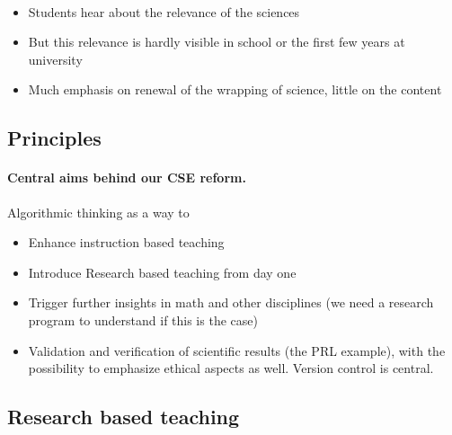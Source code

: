 \documentclass[%
twoside,                 %
final,                   %
10pt]{article}
\begin{document}
\paragraph{}

\begin{itemize}
\item Students hear about the relevance of the sciences

\item But this relevance is hardly visible in school or the first few years at university

\item Much emphasis on renewal of the wrapping of science, little on the content
\end{itemize}

\noindent




\subsection{Principles}

\paragraph{Central aims behind our CSE reform.}

Algorithmic  thinking as a way to

\begin{itemize}
\item Enhance instruction based teaching

\item Introduce Research based teaching  from day one

\item Trigger further insights in math and other disciplines (we need a research program to understand if this is the case)

\item Validation and verification of scientific results (the PRL example), with the possibility to emphasize ethical aspects as well. Version control is central.
\end{itemize}

\noindent





\subsection{Research based teaching}
\end{document}
